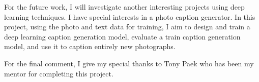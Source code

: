 \documentclass[11pt]{article}
\begin{document}
For the future work, I will investigate another interesting projects using deep learning techniques. I have special interests in a photo caption generator. In this project, using the photo and text data for training, I aim to design and train a deep learning caption generation model, evaluate a train caption generation model, and use it to caption entirely new photographs.


For the final comment,
I give my special thanks to Tony Paek who has been my mentor for completing this project.

\newpage



%
%
\end{document}
